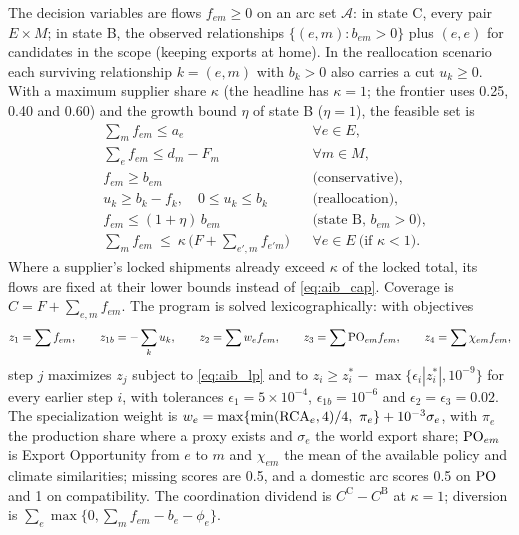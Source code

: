 The decision variables are flows $f_{em}\ge0$ on an arc set $\mathcal A$: in state C, every pair
$E\times M$; in state B, the observed relationships $\{(e,m):b_{em}>0\}$ plus $(e,e)$ for candidates in
the scope (keeping exports at home). In the reallocation scenario each surviving relationship $k=(e,m)$
with $b_k>0$ also carries a cut $u_k\ge0$. With a maximum supplier share $\kappa$ (the headline has
$\kappa=1$; the frontier uses 0.25, 0.40 and 0.60) and the growth bound $\eta$ of state B ($\eta=1$),
the feasible set is
\begin{subequations}\label{eq:aib_lp}
\begin{align}
  & \textstyle\sum_{m}f_{em}\le a_e && \forall e\in E, \label{eq:aib_supply}\\
  & \textstyle\sum_{e}f_{em}\le d_m-F_m && \forall m\in M, \label{eq:aib_demand}\\
  & f_{em}\ge b_{em} && \text{(conservative)}, \label{eq:aib_lock}\\
  & u_k\ge b_k-f_k,\quad 0\le u_k\le b_k && \text{(reallocation)}, \label{eq:aib_cut}\\
  & f_{em}\le(1+\eta)\,b_{em} && \text{(state B, } b_{em}>0), \label{eq:aib_growth}\\
  & \textstyle\sum_{m}f_{em}\ \le\ \kappa\,\bigl(F+\sum_{e',m}f_{e'm}\bigr) && \forall e\in E \ \text{(if } \kappa<1). \label{eq:aib_cap}
\end{align}
\end{subequations}
Where a supplier's locked shipments already exceed $\kappa$ of the locked total, its flows are fixed at
their lower bounds instead of \eqref{eq:aib_cap}. Coverage is $C=F+\sum_{e,m}f_{em}$. The program is
solved lexicographically: with objectives
\begin{equation}\label{eq:aib_objectives}
  z_1=\sum f_{em},\qquad z_{1b}=-\sum_k u_k,\qquad z_2=\sum w_e f_{em},\qquad
  z_3=\sum \mathrm{PO}_{em}f_{em},\qquad z_4=\sum \chi_{em}f_{em},
\end{equation}
step $j$ maximizes $z_j$ subject to \eqref{eq:aib_lp} and to $z_i\ge z_i^{*}-\max\{\epsilon_i|z_i^{*}|,
10^{-9}\}$ for every earlier step $i$, with tolerances $\epsilon_1=5\times10^{-4}$,
$\epsilon_{1b}=10^{-6}$ and $\epsilon_2=\epsilon_3=0.02$. The specialization weight is
$w_e=\max\{\min(\RCA_e,4)/4,\ \pi_e\}+10^{-3}\sigma_e$, with $\pi_e$ the production share where a proxy
exists and $\sigma_e$ the world export share; $\mathrm{PO}_{em}$ is Export Opportunity from $e$ to $m$ and
$\chi_{em}$ the mean of the available policy and climate similarities; missing scores are
0.5, and a domestic arc scores 0.5 on $\mathrm{PO}$ and 1 on compatibility. The coordination dividend is
$C^{\mathrm C}-C^{\mathrm B}$ at $\kappa=1$; diversion is $\sum_e\max\{0,\sum_m f_{em}-b_e-\phi_e\}$.

